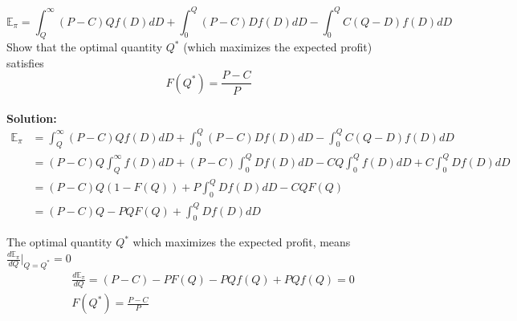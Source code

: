 \documentclass{article}
\begin{document}
\begin{equation}
    \mathbb{E}_{\pi} = \int_{Q}^{\infty} (P-C) Q f(D) dD +  \int_{0}^{Q} (P-C) D f(D) dD -\int_{0}^{Q} C(Q-D) f(D) dD
\end{equation}
Show that the optimal quantity $Q^*$ (which maximizes the expected profit) satisfies
\begin{equation}
    F(Q^*) = \frac{P-C}{P}
\end{equation}
\\
\textbf{Solution:} \\
\begin{equation}
\begin{aligned}
\mathbb{E}_{\pi} & = \int_{Q}^{\infty} (P-C) Q f(D) dD +  \int_{0}^{Q} (P-C) D f(D) dD -\int_{0}^{Q} C(Q-D) f(D) dD \\
& = (P-C)Q\int_{Q}^{\infty} f(D) dD + (P-C) \int_{0}^{Q}  D f(D) dD -CQ\int_{0}^{Q}f(D) dD + C\int_{0}^{Q}Df(D) dD \\
& = (P-C)Q(1-F(Q))+P \int_{0}^{Q} D f(D) dD - CQF(Q) \\
& = (P-C)Q - PQF(Q) + \int_{0}^{Q} D f(D) dD
\end{aligned}
\end{equation}

The optimal quantity $Q^{*}$ which maximizes the expected profit, means\\ $\frac{d \mathbb{E}_{\pi}}{dQ}|_{Q=Q^{*}} =0 $
\begin{equation}
\begin{aligned}
& \frac{d \mathbb{E}_{\pi}}{dQ}  = (P-C)-PF(Q)-PQf(Q)+PQf(Q) = 0 \\
& F(Q^{*}) = \frac{P-C}{P}
\end{aligned}
\end{equation}


%
%
\end{document}
